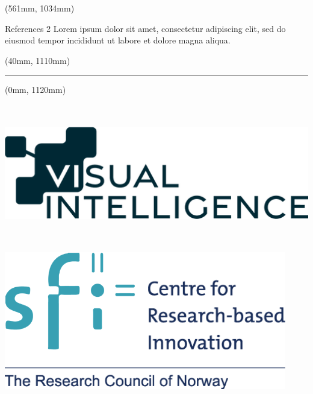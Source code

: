 \documentclass{beamer}
\begin{document}
\begin{frame}
    \begin{textblock*}{249mm}(561mm, 1034mm)
        \begin{minipage}[t][50mm][t]{\textwidth}
            \begin{block}{\small References 2}
                \small Lorem ipsum dolor sit amet, consectetur adipiscing elit, sed do eiusmod tempor incididunt ut labore et dolore magna aliqua.
            \end{block}
        \end{minipage}
    \end{textblock*}
    
    
    \begin{textblock*}{742mm}(40mm, 1110mm)
        \rule{\textwidth}{1pt}
    \end{textblock*}
    \begin{textblock*}{841mm}(0mm, 1120mm)
        \begin{minipage}[tc]{0.33\textwidth}
            \centering
            \includegraphics[width=\textwidth, height=60mm,keepaspectratio]{images/logo-visual-intelligence.png}
        \end{minipage}
        \begin{minipage}[tc]{0.15\textwidth}
            \centering
            \includegraphics[width=\textwidth,height=60mm,keepaspectratio]{images/logo-cri.png}

\end{minipage}
\end{textblock*}
\end{frame}
\end{document}
